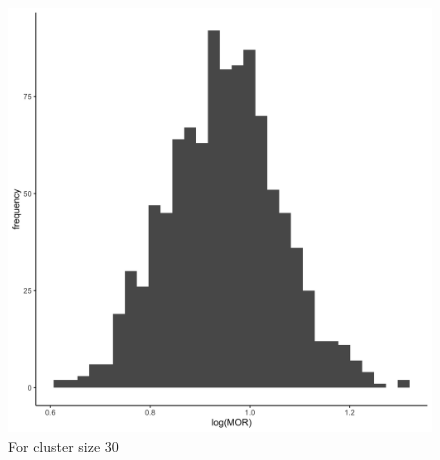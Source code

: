 \documentclass[
  letterpaper,
  DIV=11,
  numbers=noendperiod,
  titlepage]{scrartcl}
\begin{document}
\begin{figure}
\begin{minipage}[t]{0.50\linewidth}
{{\includegraphics{../../plots/two-lvl-ran-slope/low-prev/hist_100_30_two_lvl_slp_low_prev.png}

}

\caption{For cluster size 30}

}

\end{minipage}%
%
\begin{minipage}[t]{0.50\linewidth}

{\centering 

}
\end{minipage}
\end{figure}
\end{document}

